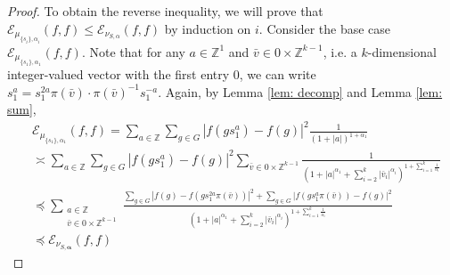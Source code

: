 \documentclass[pdflatex,sn-mathphys-num]{sn-jnl}%
\theoremstyle{thmstyleone}%
\theoremstyle{thmstyletwo}%
\theoremstyle{thmstylethree}%
\begin{document}
\begin{proof}
To obtain the reverse inequality, we will prove that  $\mathcal{E}_{\mu_{\{s_i\},\alpha_i}} (f,f)  \le \mathcal{E}_{\nu_{S, \alpha}}(f,f)$ by induction on $i$. Consider the base case $\mathcal{E}_{\mu_{\{s_1\},\alpha_1}}(f,f)  $. Note that for any 
 $a \in \mathbb{Z}^1$ and $\bar{v} \in 0 \times \mathbb{Z}^{k-1}$, i.e. a  $k$-dimensional integer-valued vector with the first entry 0, we can write
$s_1^{a} = s_1^{2a}  \pi(\bar{v}) \cdot \pi(\bar{v})^{-1} s_1^{-a}$. Again, by Lemma \ref{lem: decomp} and Lemma \ref{lem: sum}, 
\begin{align*}
&\mathcal{E}_{\mu_{\{s_1\},\alpha_1}} (f,f)  
 =  \sum_{a \in \mathbb{Z}}\sum_{g\in G} |f(gs_1^{a}) - f(g)|^2  \frac{1}{(1+ |a|)^{1+\alpha_1}} \\
    &\asymp \sum_{a \in \mathbb{Z}}\sum_{g\in G} |f(gs_1^{a}) - f(g)|^2  \sum_{
\bar{v}  \in 0\times \mathbb{Z}^{k-1}} \frac{1}{(1 + |a|^{\alpha_1} + \sum_{i=2}^k 
|\bar{v}_i|^{\alpha_i})^{1 + \sum_{i=1}^k \frac{1}{\alpha_i}}} \\
   & \preccurlyeq 
    \sum_{ 
\substack{ a \in \mathbb{Z}\\\bar{v} \in 0\times \mathbb{Z}^{k-1}}}  
   \frac{\sum_{g\in G} |f(g) - f(gs_1^{2a}  \pi(\bar{v} ))|^2 + \sum_{g\in G} |f(gs_1^{a}  \pi(\bar{v} )) - f(g)|^2  }{(1 + |a|^{\alpha_1} + \sum_{i=2}^k 
|\bar{v}_i|^{\alpha_i})^{1 + \sum_{i=1}^k \frac{1}{\alpha_i}}} \\
   & \preccurlyeq \mathcal{E}_{\nu_{S,\bm{\alpha}}}(f,f)
\end{align*}


\end{proof}
\end{document}

